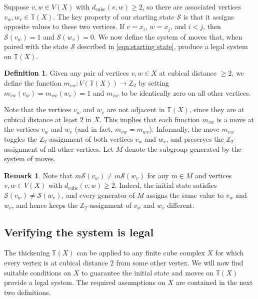 \documentclass[12pt, letterpaper]{article}
\newcommand{\Z}{\mathbb{Z}}
\def\S{\mathcal{S}}
\def\Z{\mathbb{Z}}
\theoremstyle{plain}
\theoremstyle{definition}
\newtheorem{defn}[thm]{Definition}
\newtheorem{rmk}[thm]{Remark}
\begin{document}
Suppose $v, w \in V(X)$ with $d_{\text{cube}}(v,w) \geq 2$, so there are associated vertices $v_w, w_v \in \mathbb{T}(X)$. The key property of our starting state $\mathcal{S}$ is that it assigns opposite values to these two vertices. If $v=x_i$, $w = x_j$, and $ i < j$, then $\S(v_w) = 1$ and $\S(w_v) = 0$. We now define the system of moves that, when paired with the state $\S$ described in \eqref{eqn:starting state}, produce a legal system on $\mathbb{T}(X)$.
 
\begin{defn}\label{def:moves}
    Given any pair of vertices $v,w \in X$ at cubical distance $\geq 2$, we define the function $m_{vw} \colon V(\mathbb{T}(X))\rightarrow \Z_2$ by setting $m_{vw}(v_w)=m_{vw}(w_v)=1$ and $m_{vw}$ to be identically zero on all other vertices. 
\end{defn}

% 
 
Note that the vertices $v_w$ and $w_v$ are not adjacent in $\mathbb{T}(X)$, since they are at cubical distance at least $2$ in $X$. This implies that each function $m_{vw}$ is a move at the vertices $v_w$ and $w_v$ (and in fact, $m_{vw}=m_{wv}$). Informally, the move $m_{vw}$ toggles the $\mathbb{Z}_2$-assignment of both vertices $v_w$ and $w_v$, and preserves the $\mathbb{Z}_2$-assignment of all other vertices. Let $M$ denote the subgroup generated by the system of moves.

\begin{rmk}\label{rem:opposite parity}
    Note that $m \S (v_w) \neq m \S(w_v)$ for any $m \in M$ and vertices $v, w \in V(X)$ with $d_{\text{cube}}(v,w) \geq 2$. Indeed, the initial state satisfies $\S(v_w) \neq \S(w_v)$, and every generator of $M$ assigns the same value to $v_w$ and $w_v$, and hence keeps the $\mathbb{Z}_2$-assignment of $v_w$ and $w_v$ different.
\end{rmk}

\subsection{Verifying the system is legal}

The thickening $\mathbb{T}(X)$ can be applied to any finite cube complex $X$ for which every vertex is at cubical distance $2$ from some other vertex. We will now find suitable conditions on $X$ to guarantee the initial state and moves on $\mathbb{T}(X)$ provide a legal system. The required assumptions on $X$ are contained in the next two definitions.
\end{document}
